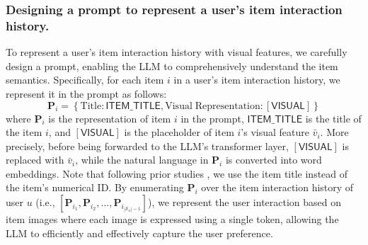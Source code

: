 \documentclass[sigconf]{acmart}
\begin{document}
\subsubsection{\textbf{Designing a prompt to represent a user's item interaction history.}} 
To represent a user's item interaction history with visual features, we carefully design a prompt, enabling the LLM to comprehensively understand the item semantics.
Specifically, for each item $i$ in a user's item interaction history, we represent it in the prompt as follows:
\vspace{-0.1ex}
\begin{equation}
    \mathbf{P}_i=\left\{ \textrm{Title}: \textsf{ITEM\_TITLE}, \textrm{Visual}\; \textrm{Representation}: \left[ \textsf{VISUAL} \right] \right\}
    \label{eqn:2}
\end{equation}
where $\mathbf{P}_i$ is the representation of item $i$ in the prompt, $\textsf{ITEM\_TITLE}$ is the title of the item $i$, and $\left[ \textsf{VISUAL} \right]$ is the placeholder of item $i$'s visual feature $\bar{v}_i$. 
More precisely, before being forwarded to the LLM's transformer layer, $\left[ \textsf{VISUAL} \right]$ is replaced with $\bar{v}_i$, while the natural language in $\mathbf{P}_i$ is converted into word embeddings. 
Note that following prior studies \cite{bao2023tallrec,li2023text}, we use the item title instead of the item's numerical ID.
By enumerating $\mathbf{P}_i$ over the item interaction history of user $u$ (i.e., $[\mathbf{P}_{i_1}, \mathbf{P}_{i_2}, ..., \mathbf{P}_{i_{|\mathcal{S}_u|-1}}]$), we represent the user interaction based on item images where each image is expressed using a single token, allowing the LLM to efficiently and effectively capture the user preference.


\vspace{-1.3ex}
\end{document}
